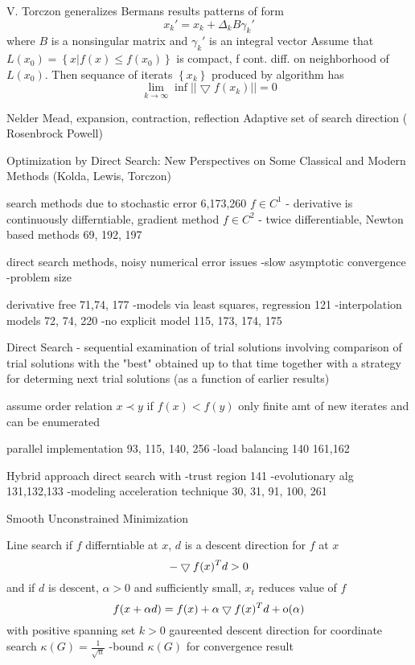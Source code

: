 V. Torczon generalizes Bermans results
patterns of form 
\begin{equation}
x_k' = x_k + \Delta_k B \gamma_k'
\end{equation}
where $B$ is a nonsingular matrix and $\gamma_k'$ is an integral vector
Assume that $L(x_0) = \left\{ x | f(x)  \le f(x_0) \right\} $ is compact, f cont. diff. on neighborhood of $L(x_0)$.  Then sequance of iterats $\left\{ x_k \right\}$ produced by algorithm has
\begin{equation}
\lim_{k \rightarrow \infty} \inf || \bigtriangledown f (x_k) || = 0
\end{equation}


Nelder Mead, expansion, contraction, reflection
Adaptive set of search direction ( Rosenbrock Powell)

Optimization by Direct Search: New Perspectives on Some Classical and Modern Methods (Kolda, Lewis, Torczon) \cite{kolda_2003}


search methods due to stochastic error 6,173,260
$f\in C^1$ - derivative is continuously differntiable, gradient method
$f \in C^2$ - twice differentiable, Newton based methods 69, 192, 197

direct search methods, noisy numerical error
issues
-slow asymptotic convergence
-problem size

derivative free 71,74, 177
-models via least squares, regression 121
-interpolation models 72, 74, 220
-no explicit model 115, 173, 174, 175

Direct Search - sequential examination of trial solutions involving comparison of trial solutions with the "best" obtained up to that time together with a strategy for determing next trial solutions (as a function of earlier results)


assume order relation
$ x \prec y$ if $f(x) < f(y)$
only finite amt of new iterates and can be enumerated

parallel implementation 93, 115, 140, 256
-load balancing 140
161,162

Hybrid approach
direct search with
-trust region 141
-evolutionary alg 131,132,133
-modeling acceleration technique 30, 31, 91, 100, 261

Smooth Unconstrained Minimization

Line search
if $f$ differntiable at $x$, $d$ is a descent direction for $f$ at $x$ 
\begin{equation}
- \bigtriangledown f(x)^T d > 0
\end{equation}
and if $d$ is descent, $\alpha >0$ and sufficiently small, $x_t$ reduces value of $f$
\begin{equation}
f(x + \alpha d) = f(x) + \alpha \bigtriangledown f(x)^T d + \mbox{o}(\alpha)
\end{equation}
with positive spanning set $k>0$
gaureented descent direction
for coordinate search $\kappa (G) = \frac{1}{\sqrt{n}}$
-bound $\kappa (G)$ for convergence result


